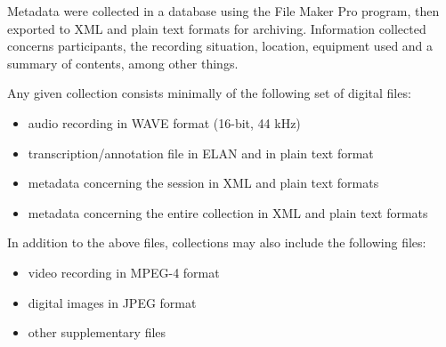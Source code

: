 Metadata were collected in a database using the File Maker Pro program, then exported to XML and plain text formats for archiving. Information collected concerns participants, the recording situation, location, equipment used and a summary of contents, among other things.

Any given collection consists minimally of the following set of digital files: %
\begin{itemize}
\item{audio recording in WAVE format (16-bit, 44 kHz)}
\item{transcription/annotation file in ELAN and in plain text format}
\item{metadata concerning the session in XML and plain text formats}
\item{metadata concerning the entire collection in XML and plain text formats}
\end{itemize}
In addition to the above files, collections may also include the following files:
\begin{itemize}
\item{video recording in MPEG-4 format}
\item{digital images in JPEG format}
\item{other supplementary files}
\end{itemize}

